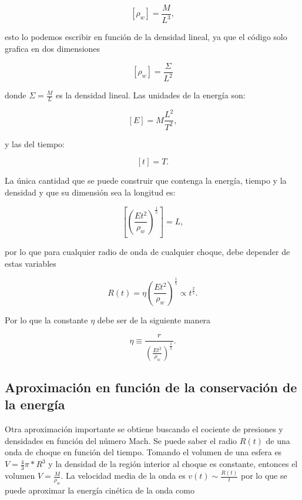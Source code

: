 \documentclass[12pt,a4paper]{book}
\begin{document}
\begin{equation}
  \left[ \rho_w \right] = \frac{M}{L^3},
\end{equation}

\noindent esto lo podemos escribir en función de la densidad lineal, ya que el código solo grafica en dos dimensiones 


\begin{equation}
  \left[ \rho_w \right] = \frac{\Sigma}{L^2}
\end{equation}

\noindent donde $\Sigma = \frac{M}{L}$ es la densidad lineal. Las unidades de la energía son:


\begin{equation}
  \left[E\right] = M \frac{L^2}{T^2},
\end{equation}

\noindent y las del tiempo:

\begin{equation}
  \left[ t\right] = T.
\end{equation}

\noindent La única cantidad que se puede construir que contenga la energía, tiempo y la densidad y que su dimensión sea la longitud es:

\begin{equation}
  \left[ \left( \frac{Et^2}{ \rho_w } \right)^{\frac{1}{5}}\right] = L,
\end{equation}

\noindent por lo que para cualquier radio de onda de cualquier choque, debe depender de estas variables

\begin{equation}
  R(t) = \eta  \left( \frac{Et^2}{ \rho_w } \right)^{\frac{1}{5}} \varpropto t^{\frac{2}{5}}.
\end{equation}

\noindent Por lo que la constante $\eta$ debe ser de la siguiente manera

\begin{equation}
  \eta \equiv \frac{r}{\left( \frac{Et^2}{\rho_w} \right)^{\frac{1}{5}}}.
\end{equation}



\subsection{Aproximación en función de la conservación de la energía}

Otra aproximación importante se obtiene buscando el cociente de presiones y densidades en función del número Mach.
Se puede saber el radio $R(t)$ de una onda de choque en función del tiempo. Tomando el volumen de una esfera es $V = \frac{4}{3} \pi * R^3$ y la densidad de la región interior al choque es constante, entonces 
el volumen $V = \frac{M}{\rho_w}$. La velocidad media de la onda es $v(t) \sim \frac{R(t)}{t} $
por lo que se puede aproximar la energía cinética de la onda como 
\end{document}

